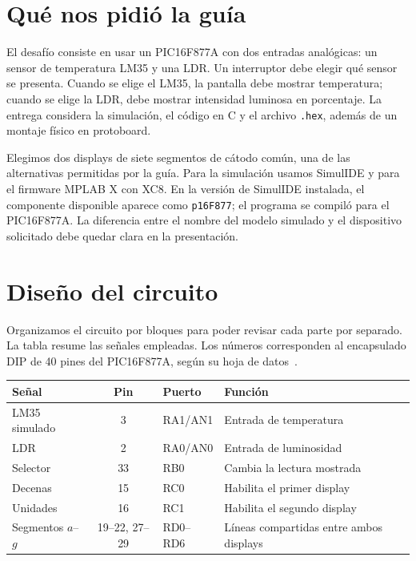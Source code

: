 \documentclass[11pt,a4paper]{article}
\begin{document}
\section{Qué nos pidió la guía}

El desafío consiste en usar un PIC16F877A con dos entradas analógicas: un sensor de temperatura LM35 y una LDR. Un interruptor debe elegir qué sensor se presenta. Cuando se elige el LM35, la pantalla debe mostrar temperatura; cuando se elige la LDR, debe mostrar intensidad luminosa en porcentaje. La entrega considera la simulación, el código en C y el archivo \texttt{.hex}, además de un montaje físico en protoboard.

Elegimos dos displays de siete segmentos de cátodo común, una de las alternativas permitidas por la guía. Para la simulación usamos SimulIDE y para el firmware MPLAB X con XC8. En la versión de SimulIDE instalada, el componente disponible aparece como \texttt{p16F877}; el programa se compiló para el PIC16F877A. La diferencia entre el nombre del modelo simulado y el dispositivo solicitado debe quedar clara en la presentación.

\section{Diseño del circuito}

Organizamos el circuito por bloques para poder revisar cada parte por separado. La tabla resume las señales empleadas. Los números corresponden al encapsulado DIP de 40 pines del PIC16F877A, según su hoja de datos~\cite{pic}.

\begin{center}
\small
\begin{tabularx}{\linewidth}{@{}lclX@{}}
\toprule
Señal & Pin & Puerto & Función \\
\midrule
LM35 simulado & 3 & RA1/AN1 & Entrada de temperatura \\
LDR & 2 & RA0/AN0 & Entrada de luminosidad \\
Selector & 33 & RB0 & Cambia la lectura mostrada \\
Decenas & 15 & RC0 & Habilita el primer display \\
Unidades & 16 & RC1 & Habilita el segundo display \\
Segmentos $a$--$g$ & 19--22, 27--29 & RD0--RD6 & Líneas compartidas entre ambos displays \\
\bottomrule
\end{tabularx}
\end{center}
\end{document}
